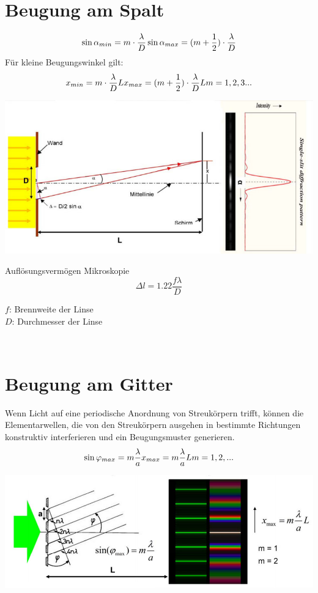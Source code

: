 \section{Beugung am Spalt}
\[
	\sin\alpha_{min}=m\cdot \frac{\lambda}{D} \\
	\sin\alpha_{max}=(m+\frac{1}{2})\cdot \frac{\lambda}{D}	
\]
Für kleine Beugungswinkel gilt:
\[
	x_{min}=m\cdot\frac{\lambda}{D}L\\
	x_{max}=(m+\frac{1}{2})\cdot\frac{\lambda}{D}L\\ \\
	m=1,2,3...
\]
\begin{center}
	\includegraphics[scale = 0.3]{images/beugung_spalt.jpg}
\end{center}
Auflösungsvermögen Mikroskopie
\[
	\Delta l=1.22 \frac{f\lambda}{D}
\]
\begin{footnotesize}
	$f$:	Brennweite der Linse \\
	$D$:	Durchmesser der Linse\\
\end{footnotesize}
\\
\section{Beugung am Gitter}
Wenn Licht auf eine periodische Anordnung von Streukörpern trifft, können die Elementarwellen, die von den Streukörpern ausgehen in bestimmte Richtungen konstruktiv interferieren und ein Beugungsmuster generieren.
\[
	\sin \varphi_{max}=m\frac{\lambda}{a} \\
	x_{max}=m\frac{\lambda}{a}L \\
	m=1,2,...
\]
\begin{center}
	\includegraphics[scale = 0.25]{images/beugung_gitter.jpg}
\end{center}
\
